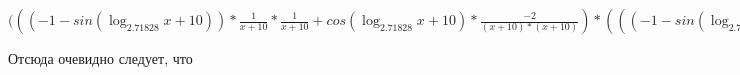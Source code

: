 \documentclass[12pt,a4paper,fleqn]{article}
\theoremstyle{definition}
\begin{document}
$((( -1  - sin(\log_{ 2.71828 }{ x  +  10 })) * \frac{ 1 }{ x  +  10 }
 * \frac{ 1 }{ x  +  10 }
 + cos(\log_{ 2.71828 }{ x  +  10 }) * \frac{ -2 }{( x  +  10 ) * ( x  +  10 )}
) * ((( -1  - sin(\log_{ 2.71828 }{ x  +  10 })) * \frac{ 1 }{ x  +  10 }
 * \frac{ 1 }{ x  +  10 }
 + cos(\log_{ 2.71828 }{ x  +  10 }) * \frac{ -1  -  1 }{( x  +  10 ) * ( x  +  10 )}
) * { 3 }^{sin(\log_{ 2.71828 }{ x  +  10 })} + cos(\log_{ 2.71828 }{ x  +  10 }) * \frac{ 1 }{ x  +  10 }
 * cos(\log_{ 2.71828 }{ x  +  10 }) * \frac{ 1 }{ x  +  10 }
 * { 3 }^{sin(\log_{ 2.71828 }{ x  +  10 })}) = (( -1  - sin(\log_{ 2.71828 }{ x  +  10 })) * \frac{ 1 }{ x  +  10 }
 * \frac{ 1 }{ x  +  10 }
 + cos(\log_{ 2.71828 }{ x  +  10 }) * \frac{ -2 }{( x  +  10 ) * ( x  +  10 )}
) * ((( -1  - sin(\log_{ 2.71828 }{ x  +  10 })) * \frac{ 1 }{ x  +  10 }
 * \frac{ 1 }{ x  +  10 }
 + cos(\log_{ 2.71828 }{ x  +  10 }) * \frac{ -1  -  1 }{( x  +  10 ) * ( x  +  10 )}
) * { 3 }^{sin(\log_{ 2.71828 }{ x  +  10 })} + cos(\log_{ 2.71828 }{ x  +  10 }) * \frac{ 1 }{ x  +  10 }
 * cos(\log_{ 2.71828 }{ x  +  10 }) * \frac{ 1 }{ x  +  10 }
 * { 3 }^{sin(\log_{ 2.71828 }{ x  +  10 })})$

Отсюда очевидно следует, что
\end{document}
